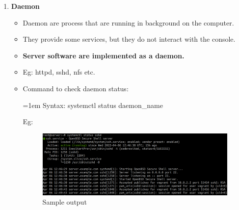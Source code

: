 \begin{flushleft}
\begin{enumerate}
\begin{itemize}
	
	\end{itemize}
\newpage
	\item \textbf{Daemon}
	\begin{itemize}
		\item Daemon are process that are running in background on the computer.
		\item They provide some services, but they do not interact with the console.
		\item \textbf{Server software are implemented as a daemon.}
		\item Eg: httpd, sshd, nfs etc.
		\item Command to check daemon status:
		\bigskip
		\begin{tcolorbox}[breakable,notitle,boxrule=-0pt,colback=pink,colframe=pink]
			\color{black}
			\font=1em
			Syntax: systemctl status daemon\_name
			\font=4pt
		\end{tcolorbox}
		Eg:
		\begin{figure}[h!]
			\centering
			\includegraphics[scale=.2]{content/chapter12/images/proc.png}
			\caption{Sample output}
			\label{fig:process23}
		\end{figure}
	\end{itemize}
	
	

	
	
\end{enumerate}
	
		
\end{flushleft}

\newpage


